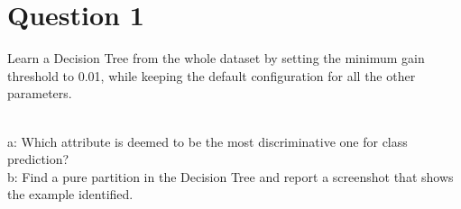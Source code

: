 \section{Question 1}

\begin{question}
     Learn a Decision Tree from the whole dataset by setting the minimum gain threshold to 0.01, while
keeping the default configuration for all the other parameters.

\\
    a: Which attribute is deemed to be the most discriminative one for class prediction?
\\
    b: Find a pure partition in the Decision Tree and report a screenshot that shows the
    example identified.
\end{question}
\begin{anwer}
\end{anwer}